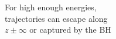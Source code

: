 \documentclass[preview]{standalone}
\begin{document}
For high enough energies,\\trajectories can escape along\\$z\pm\infty$ or captured by the BH\\
\end{document}
